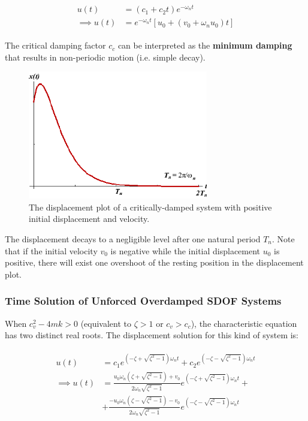 \documentclass[10pt,b5paper,titlepage]{book}
\newenvironment{ematrix}
{
    \begin{eqnarray}
        \begin{aligned}
}
{
        \end{aligned}
    \end{eqnarray}
}
\begin{document}
\begin{ematrix}
    u(t) &= \left( c_1 + c_2 t \right) e^{-\omega_n t}\\
    \implies u(t) &= e^{-\omega_n t} \left[ u_0 + \left( v_0 + \omega_n u_0 \right) t \right]
\end{ematrix}

The critical damping factor $ c_c $ can be interpreted as the \textbf{minimum damping}
that results in non-periodic motion (i.e. simple decay).

\begin{figure}[ht]
    \centering
    \includegraphics[width=0.70\textwidth]{img/SDOF_CriticalDamped_Response.png}
    \caption{The displacement plot of a critically-damped system with positive initial
displacement and velocity.}
    \label{fig:SDOF-critically-damped-response-png}
\end{figure}

The displacement decays to a negligible level after one natural period $ T_n $.
Note that if the initial velocity $ v_0 $ is negative while the initial displacement
$ u_0 $ is positive, there will exist one overshoot of the resting position in
the displacement plot.


\subsubsection{Time Solution of Unforced Overdamped SDOF Systems}

When $ c_v^2 - 4 m k > 0 $ (equivalent to $ \zeta > 1 $ or $ c_v > c_c $),
the characteristic equation has two distinct real roots. The displacement
solution for this kind of system is:

\begin{ematrix}
    u(t) &= c_1 e^{\left( -\zeta + \sqrt{\zeta^2 - 1} \right) \omega_n t}
          +  c_2 e^{\left( -\zeta - \sqrt{\zeta^2 - 1} \right) \omega_n t}\\
    \implies u(t) &=
    \frac{u_0 \omega_n \left( \zeta + \sqrt{\zeta^2 - 1} \right) + v_0}
    {2 \omega_n \sqrt{\zeta^2 - 1}} e^{\left( -\zeta + \sqrt{\zeta^2 - 1} \right) \omega_n t} +\\
                  &+
    \frac{-u_0 \omega_n \left( \zeta - \sqrt{\zeta^2 - 1} \right) - v_0}
    {2 \omega_n \sqrt{\zeta^2 - 1}} e^{\left( -\zeta - \sqrt{\zeta^2 - 1} \right) \omega_n t}
\end{ematrix}
\end{document}

